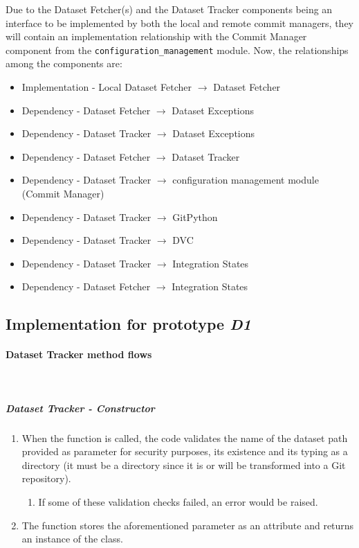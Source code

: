 Due to the Dataset Fetcher(s) and the Dataset Tracker components being an interface to be implemented by both the local and remote commit managers, they will contain 
an implementation relationship with the Commit Manager component from the \texttt{configuration\_management} module. Now, the relationships among the components are:

\begin{itemize}
    \item Implementation - Local Dataset Fetcher $\rightarrow$ Dataset Fetcher
    \item Dependency - Dataset Fetcher $\rightarrow$ Dataset Exceptions
    \item Dependency - Dataset Tracker $\rightarrow$ Dataset Exceptions
    \item Dependency - Dataset Fetcher $\rightarrow$ Dataset Tracker
    \item Dependency - Dataset Tracker $\rightarrow$ configuration management module (Commit Manager)
    \item Dependency - Dataset Tracker $\rightarrow$ GitPython
    \item Dependency - Dataset Tracker $\rightarrow$ DVC
    \item Dependency - Dataset Tracker $\rightarrow$ Integration States
    \item Dependency - Dataset Fetcher $\rightarrow$ Integration States
\end{itemize}

\subsection{Implementation for prototype \emph{D1}}

\paragraph{Dataset Tracker method flows} \mbox{}\\

\subparagraph{Dataset Tracker - Constructor}

\begin{enumerate}
    \item When the function is called, the code validates the name of the dataset path provided as parameter for security purposes, its existence and its typing as a directory
    (it must be a directory since it is or will be transformed into a Git repository).

    \begin{enumerate}
        \item If some of these validation checks failed, an error would be raised.
    \end{enumerate}

    \item The function stores the aforementioned parameter as an attribute and returns an instance of the class. 
\end{enumerate}

